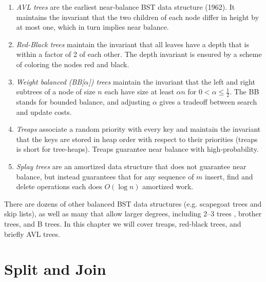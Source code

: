 \begin{enumerate}
\item \emph{AVL trees}  are the earliest near-balance BST data
  structure (1962).  It maintains the invariant that the two children
  of each node differ in height by at most one, which in turn implies
  near balance.

\item \emph{Red-Black trees} maintain the invariant that all leaves
  have a depth that is within a factor of 2 of each other.  The depth
  invariant is ensured by a scheme of coloring the nodes red and
  black.

\item \emph{Weight balanced (BB[$\alpha$]) trees} maintain the
  invariant that the left and right subtrees of a node of size $n$
  each have size at least $\alpha n$ for $0 < \alpha \leq
  \frac{1}{2}$.  The BB stands for bounded balance, and adjusting
  $\alpha$ gives a tradeoff between search and update costs.

\item \emph{Treaps} associate a random priority with every key and
  maintain the invariant that the keys are stored in heap order with
  respect to their priorities (treaps is short for tree-heaps).
  Treaps guarantee near balance with high-probability.

\item \emph{Splay trees} are an amortized data structure that does not
  guarantee near balance, but instead guarantees that for any sequence
  of $m$ insert, find and delete operations each does $O(\log n)$
  amortized work.
\end{enumerate}
There are dozens of other balanced BST data structures (e.g. scapegoat
trees and skip lists), as well as many that allow larger degrees,
including 2--3 trees , brother trees, and B trees.  In this chapter we
will cover treaps, red-black trees, and briefly AVL trees.

\section{Split and Join}


